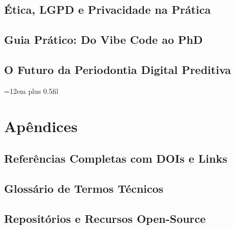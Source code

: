 \documentclass[12pt,a4paper,oneside,openright]{abntex2}
\begin{document}
\chapter{Ética, LGPD e Privacidade na Prática}

\chapter{Guia Prático: Do Vibe Code ao PhD} \label{ch:desafios}

\chapter{O Futuro da Periodontia Digital Preditiva} \label{ch:futuro}


\postextual

\emergencystretch=12em
\rightskip=0pt plus 0.5fil



\part*{Apêndices}

\chapter{Referências Completas com DOIs e Links}

\chapter{Glossário de Termos Técnicos}

\chapter{Repositórios e Recursos Open-Source}

\end{document}
